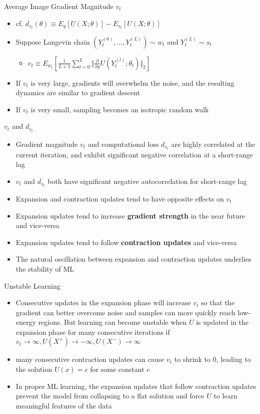 \documentclass{beamer}
\begin{document}
\begin{frame}{Average Image Gradient Magnitude $v_t$}
\begin{itemize}
\item cf. $d_{s_t}(\theta)\equiv E_q[U(X;\theta)]-E_{s_t}[U(X;\theta)]$
\item Suppose Langevin chain $(Y_t^{(0)},\dots,Y_t^{(L)})\sim w_t$ and $Y_t^{(L)}\sim s_t$\begin{itemize}
\item $v_t\equiv E_{w_t}[\frac{1}{L+1}\sum_{l=0}^L\Vert\frac{\partial}{\partial y}U(Y_t^{(l)};\theta_t)\Vert_2]$\end{itemize}
\item If $v_t$ is very large, gradients will overwhelm the noise, and the resulting dynamics are similar to gradient descent
\item If $v_t$ is very small, sampling becomes an isotropic random walk
\end{itemize}
\end{frame}


\begin{frame}{$v_t$ and $d_{s_t}$}
\begin{itemize}
\item Gradient magnitude $v_t$ and computational loss $d_{s_t}$ are highly correlated at the current iteration, and exhibit significant negative
correlation at a short-range lag
\item $v_t$ and $d_{s_t}$ both have significant
negative autocorrelation for short-range lag
\item Expansion and contraction updates tend to have opposite effects on $v_t$
\item Expansion updates tend to increase \textbf{gradient strength} in the near future and vice-versa
\item Expansion updates tend to follow \textbf{contraction updates} and vice-versa
\item The natural oscillation between expansion and contraction updates underlies the stability of ML
\end{itemize}
\end{frame}

\begin{frame}{Unstable Learning}
\begin{itemize}
\item Consecutive updates in the expansion phase will increase $v_t$ so that the gradient can better overcome noise and samples can more
quickly reach low-energy regions. But learning can become unstable when $U$ is updated in the expansion phase for many consecutive iterations if $v_t\to\infty,U(X^+)\to-\infty,U(X^-)\to\infty$
\item many consecutive contraction updates can cause $v_t$ to shrink to $0$,  leading to the solution $U(x) = c$ for some constant $c$
\item In proper ML learning, the expansion updates that follow contraction updates prevent the model from collapsing to a flat solution and force $U$ to learn meaningful features of the data
\end{itemize}
\end{frame}
\end{document}
